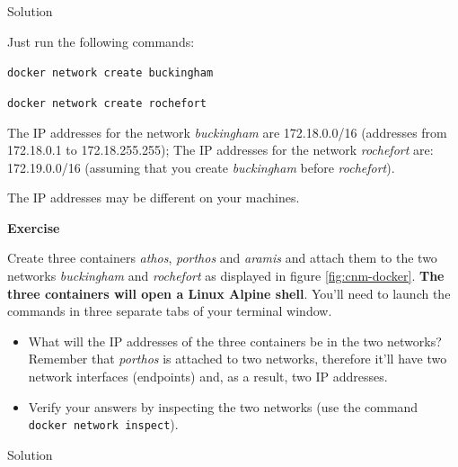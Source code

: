 \documentclass[
]{article}
\providecommand{\tightlist}{%
  \setlength{\itemsep}{0pt}\setlength{\parskip}{0pt}}
\newenvironment{infobox}[1]
  {
  \begin{itemize}
  \renewcommand{\labelitemi}{
    \raisebox{-.7\height}[0pt][0pt]{
      
    }
  }
  \setlength{\fboxsep}{1em}
  \begin{whitebox}
  \item
  }
  {
  \end{whitebox}
  \end{itemize}
  }
\theoremstyle{definition}
\theoremstyle{definition}
\theoremstyle{definition}
\theoremstyle{remark}
\let\BeginKnitrBlock\begin \let\EndKnitrBlock\end
\begin{document}
Solution

\begin{infobox}{exercisebox}
Just run the following commands:

\texttt{docker\ network\ create\ buckingham}

\texttt{docker\ network\ create\ rochefort}

The IP addresses for the network \emph{buckingham} are
172.18.0.0/16 (addresses from 172.18.0.1 to 172.18.255.255);
The IP addresses for the network \emph{rochefort} are:
172.19.0.0/16 (assuming that you create \emph{buckingham}
before \emph{rochefort}).

The IP addresses may be different on your machines.

\end{infobox}

\begin{infobox}{exercisebox}

\textbf{Exercise}

\BeginKnitrBlock{exercise}
\label{exr:unnamed-chunk-33}{\label{exr:unnamed-chunk-33} }Create three containers \emph{athos}, \emph{porthos} and \emph{aramis} and attach them
to the two networks \emph{buckingham} and \emph{rochefort} as displayed
in figure \ref{fig:cnm-docker}.
\textbf{The three containers will open a Linux Alpine shell}.
You'll need to launch the commands in three separate tabs of your terminal window.

\begin{itemize}
\tightlist
\item
  What will the IP addresses of the three containers be in the two networks?
  Remember that \emph{porthos} is attached to two networks, therefore it'll have two
  network interfaces (endpoints) and, as a result, two IP addresses.
\end{itemize}

\begin{itemize}
\tightlist
\item
  Verify your answers by inspecting the two networks (use the
  command \texttt{docker\ network\ inspect}).
\end{itemize}
\EndKnitrBlock{exercise}

\end{infobox}

Solution
\end{document}

